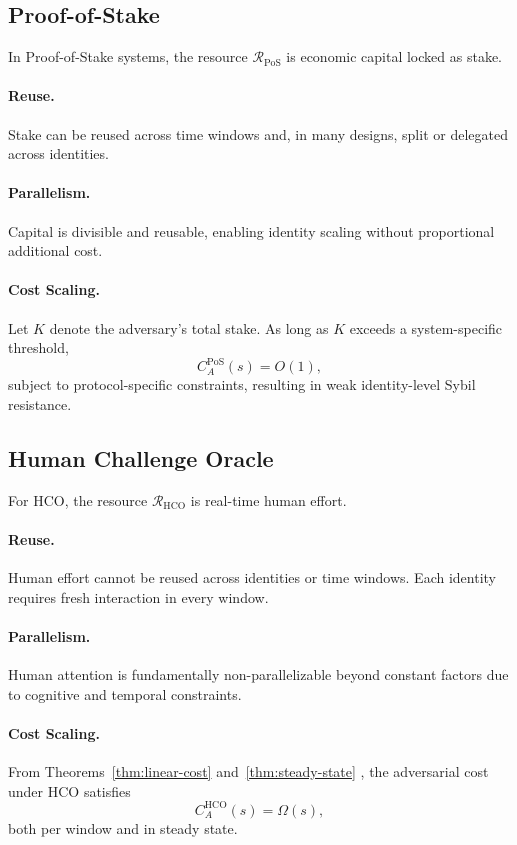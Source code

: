 \documentclass[sigconf,nonacm]{acmart}
\begin{document}
\subsection{Proof-of-Stake}
\label{subsec:pos}

In Proof-of-Stake systems, the resource
$\mathcal{R}_{\mathrm{PoS}}$ is economic capital locked as stake.

\paragraph{Reuse.}
Stake can be reused across time windows and, in many designs, split or delegated
across identities.

\paragraph{Parallelism.}
Capital is divisible and reusable, enabling identity scaling without proportional
additional cost.

\paragraph{Cost Scaling.}
Let $K$ denote the adversary’s total stake. As long as $K$ exceeds a
system-specific threshold,
\[
C_A^{\mathrm{PoS}}(s) = O(1),
\]
subject to protocol-specific constraints, resulting in weak identity-level
Sybil resistance.

\subsection{Human Challenge Oracle}
\label{subsec:hco-resource}

For HCO, the resource $\mathcal{R}_{\mathrm{HCO}}$ is real-time human effort.

\paragraph{Reuse.}
Human effort cannot be reused across identities or time windows. Each identity
requires fresh interaction in every window.

\paragraph{Parallelism.}
Human attention is fundamentally non-parallelizable beyond constant factors due
to cognitive and temporal constraints.

\paragraph{Cost Scaling.}
From Theorems~\ref{thm:linear-cost} and~\ref{thm:steady-state}
, the adversarial
cost under HCO satisfies
\[
C_A^{\mathrm{HCO}}(s) = \Omega(s),
\]
both per window and in steady state.
\end{document}
